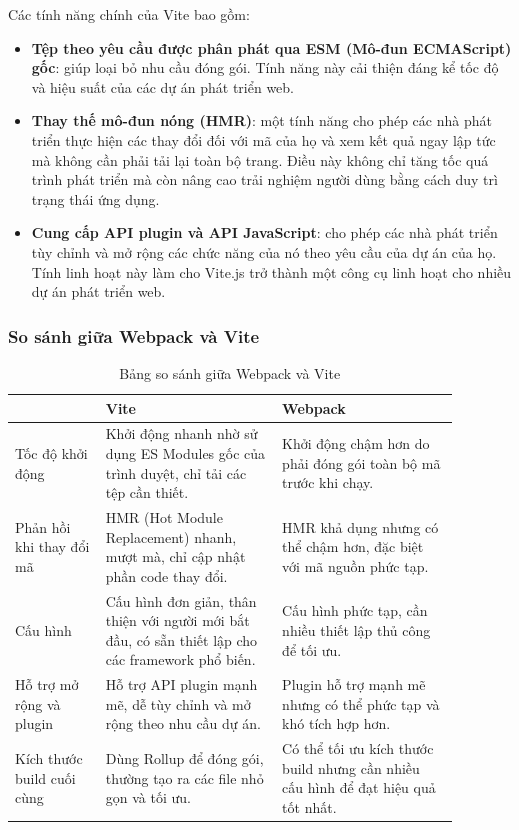 Các tính năng chính của Vite bao gồm:
\begin{itemize}
    \item \textbf{Tệp theo yêu cầu được phân phát qua ESM (Mô-đun ECMAScript) gốc}: giúp loại bỏ nhu cầu đóng gói. Tính năng này cải thiện đáng kể tốc độ và hiệu suất của các dự án phát triển web.
    \item \textbf{Thay thế mô-đun nóng (HMR)}: một tính năng cho phép các nhà phát triển thực hiện các thay đổi đối với mã của họ và xem kết quả ngay lập tức mà không cần phải tải lại toàn bộ trang. Điều này không chỉ tăng tốc quá trình phát triển mà còn nâng cao trải nghiệm người dùng bằng cách duy trì trạng thái ứng dụng.
    \item \textbf{Cung cấp API plugin và API JavaScript}: cho phép các nhà phát triển tùy chỉnh và mở rộng các chức năng của nó theo yêu cầu của dự án của họ. Tính linh hoạt này làm cho Vite.js trở thành một công cụ linh hoạt cho nhiều dự án phát triển web.
\end{itemize}

\subsubsection{So sánh giữa Webpack và Vite}
\begin{table}[H]
    \centering
    \begin{tabular}{|>{\centering\arraybackslash}p{0.18\linewidth}|>{\centering\arraybackslash}p{0.35\linewidth}|>{\centering\arraybackslash}p{0.35\linewidth}|} \hline 
         &  Vite& Webpack\\ \hline 
         Tốc độ khởi động&  	Khởi động nhanh nhờ sử dụng ES Modules gốc của trình duyệt, chỉ tải các tệp cần thiết.& Khởi động chậm hơn do phải đóng gói toàn bộ mã trước khi chạy.\\ \hline 
         Phản hồi khi thay đổi mã&  HMR (Hot Module Replacement) nhanh, mượt mà, chỉ cập nhật phần code thay đổi.& HMR khả dụng nhưng có thể chậm hơn, đặc biệt với mã nguồn phức tạp.
\\ \hline 
         Cấu hình&  Cấu hình đơn giản, thân thiện với người mới bắt đầu, có sẵn thiết lập cho các framework phổ biến.	& Cấu hình phức tạp, cần nhiều thiết lập thủ công để tối ưu.
\\ \hline 
         Hỗ trợ mở rộng và plugin&  Hỗ trợ API plugin mạnh mẽ, dễ tùy chỉnh và mở rộng theo nhu cầu dự án.& Plugin hỗ trợ mạnh mẽ nhưng có thể phức tạp và khó tích hợp hơn.
\\ \hline 
         Kích thước build cuối cùng&  Dùng Rollup để đóng gói, thường tạo ra các file nhỏ gọn và tối ưu.& Có thể tối ưu kích thước build nhưng cần nhiều cấu hình để đạt hiệu quả tốt nhất.
\\ \hline
    \end{tabular}
    \caption{Bảng so sánh giữa Webpack và Vite}
    \label{tab:Vite}
\end{table}

